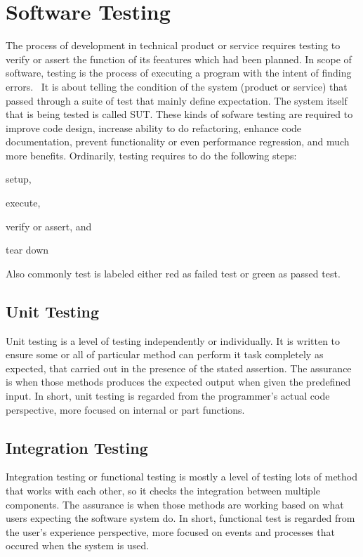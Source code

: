 \section{Software Testing}
\label{sec:software-testing}

The process of development in technical product or service requires testing to verify or assert the function of its feeatures which had been planned.
In scope of software, testing is the process of executing a program with the intent of finding errors.~\autocite{Myers:2012:Testing:6}
It is about telling the condition of the system (product or service) that passed through a suite of test that mainly define expectation.
The system itself that is being tested is called \ac{SUT}.
These kinds of sofware testing are required to improve code design, increase ability to do refactoring, enhance code documentation, prevent functionality or even performance regression, and much more benefits.
Ordinarily, testing requires to do the following steps:
\begin{inparaenum}[\itshape 1\upshape)]
\item setup,
\item execute,
\item verify or assert, and
\item tear down
\end{inparaenum}
Also commonly test is labeled either red as failed test or green as passed test.

\subsection{Unit Testing}

Unit testing is a level of testing independently or individually.
It is written to ensure some or all of particular method can perform it task completely as expected, that carried out in the presence of the stated assertion.
The assurance is when those methods produces the expected output when given the predefined input.
In short, unit testing is regarded from the programmer's actual code perspective, more focused on internal or part functions.

\subsection{Integration Testing}

Integration testing or functional testing is mostly a level of testing lots of method that works with each other, so it checks the integration between multiple components.
The assurance is when those methods are working based on what users expecting the software system do.
In short, functional test is regarded from the user's experience perspective, more focused on events and processes that occured when the system is used.

